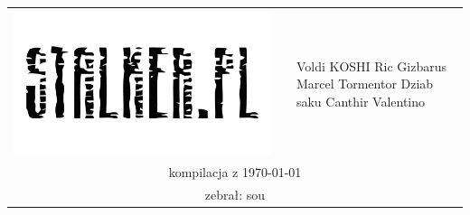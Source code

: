 \documentclass[./MAIN.tex]{subfiles}
\begin{document}
\thispagestyle{empty}
\onecolumn
\center
\begin{tabular}{clp{6em}}
\includegraphics[width=.6\hsize, clip = true, trim = 50 170 60 180]{logo_b.png}
& {\color{BrickRed}\rule{.5ex}{3.56em}} & Voldi\newline 
KOSHI\newline 
Ric\newline 
Gizbarus\newline 
Marcel\newline 
Tormentor\newline 
Dziab\newline 
saku\newline 
Canthir\newline 
Valentino\\[12em] 
\multicolumn{3}{c}{kompilacja z \today} \\ 
\multicolumn{3}{c}{zebrał: sou} \\ 
\end{tabular} 

\twocolumn
\end{document}
